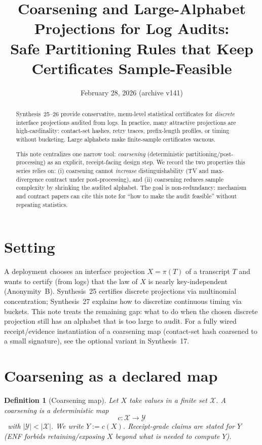 \documentclass[11pt]{article}
\title{Coarsening and Large-Alphabet Projections for Log Audits:\\
\large Safe Partitioning Rules that Keep Certificates Sample-Feasible}
\author{}
\date{February 28, 2026 (archive v141)}
\newtheorem{definition}{Definition}
\begin{document}
\maketitle

\begin{abstract}
Synthesis~25--26 provide conservative, menu-level statistical certificates for \emph{discrete} interface projections audited from logs.
In practice, many attractive projections are high-cardinality: contact-set hashes, retry traces, prefix-length profiles, or timing without bucketing.
Large alphabets make finite-sample certificates vacuous.

This note centralizes one narrow tool: \emph{coarsening} (deterministic partitioning/post-processing) as an explicit, receipt-facing design step.
We record the two properties this series relies on: (i) coarsening cannot \emph{increase} distinguishability (TV and max-divergence contract under post-processing), and (ii) coarsening reduces sample complexity by shrinking the audited alphabet.
The goal is non-redundancy: mechanism and contract papers can cite this note for ``how to make the audit feasible'' without repeating statistics.
\end{abstract}

\section{Setting}
A deployment chooses an interface projection $X=\pi(T)$ of a transcript $T$ and wants to certify (from logs) that the law of $X$ is nearly key-independent (Anonymity~B).\cite{series:profiling}
Synthesis~25 certifies discrete projections via multinomial concentration; Synthesis~27 explains how to discretize continuous timing via buckets.\cite{series:stataudit,series:bucketdesign}
This note treats the remaining gap: what to do when the chosen discrete projection still has an alphabet that is too large to audit.
For a fully wired receipt/evidence instantiation of a coarsening map (contact-set hash coarsened to a small signature), see the optional variant in Synthesis~17.\cite{series:workedexample}


\section{Coarsening as a declared map}
\begin{definition}[Coarsening map]
Let $X$ take values in a finite set $\mathcal X$.
A \emph{coarsening} is a deterministic map
\[c:\mathcal X\to\mathcal Y\]\
with $|\mathcal Y|<|\mathcal X|$.
We write $Y:=c(X)$.
Receipt-grade claims are stated for $Y$ (ENF forbids retaining/exposing $X$ beyond what is needed to compute $Y$).\cite{series:traceifaces}
\end{definition}
\end{document}
